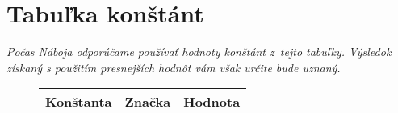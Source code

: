 \documentclass[12pt, twoside]{article}
\begin{document}
    \pagestyle{main}
    \renewcommand{\arraystretch}{1.3}
    \section{Tabuľka konštánt}
    \emph{Počas Náboja odporúčame používať hodnoty konštánt z~tejto tabuľky. Výsledok získaný s použitím presnejších hodnôt vám však určite bude uznaný.}

    \begin{figure}[H]
        \centering
        \begin{tabular}{l c c}
            \toprule
                Konštanta & Značka & Hodnota \\
            \midrule
            
            \bottomrule
        \end{tabular}
    \end{figure}
\end{document}

